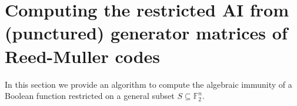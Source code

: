 \documentclass[11pt]{llncs}
\begin{document}
\section{Computing the restricted AI from (punctured) generator matrices of Reed-Muller codes}\label{sec:RMapproach}

In this section we provide an algorithm to compute the algebraic immunity of a Boolean function restricted on a general subset $S \subseteq \mathbb{F}_2^n$. 

\end{document}
